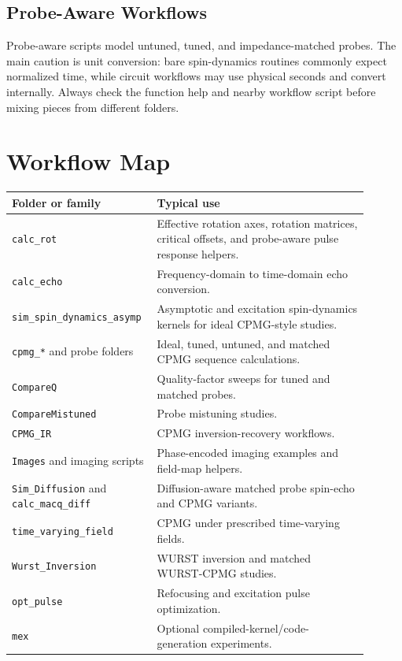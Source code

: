 \documentclass[11pt,oneside]{report}
\newcommand{\code}[1]{\texttt{#1}}
\begin{document}
\section{Probe-Aware Workflows}

Probe-aware scripts model untuned, tuned, and impedance-matched probes. The
main caution is unit conversion: bare spin-dynamics routines commonly expect
normalized time, while circuit workflows may use physical seconds and convert
internally. Always check the function help and nearby workflow script before
mixing pieces from different folders.

\chapter{Workflow Map}

\begin{longtable}{L{0.32\linewidth}L{0.58\linewidth}}
\toprule
Folder or family & Typical use \\
\midrule
\code{calc\_rot} & Effective rotation axes, rotation matrices, critical
offsets, and probe-aware pulse response helpers. \\
\code{calc\_echo} & Frequency-domain to time-domain echo conversion. \\
\code{sim\_spin\_dynamics\_asymp} & Asymptotic and excitation spin-dynamics
kernels for ideal CPMG-style studies. \\
\code{cpmg\_*} and probe folders & Ideal, tuned, untuned, and matched CPMG
sequence calculations. \\
\code{CompareQ} & Quality-factor sweeps for tuned and matched probes. \\
\code{CompareMistuned} & Probe mistuning studies. \\
\code{CPMG\_IR} & CPMG inversion-recovery workflows. \\
\code{Images} and imaging scripts & Phase-encoded imaging examples and
field-map helpers. \\
\code{Sim\_Diffusion} and \code{calc\_macq\_diff} & Diffusion-aware matched
probe spin-echo and CPMG variants. \\
\code{time\_varying\_field} & CPMG under prescribed time-varying fields. \\
\code{Wurst\_Inversion} & WURST inversion and matched WURST-CPMG studies. \\
\code{opt\_pulse} & Refocusing and excitation pulse optimization. \\
\code{mex} & Optional compiled-kernel/code-generation experiments. \\
\bottomrule
\end{longtable}
\end{document}

